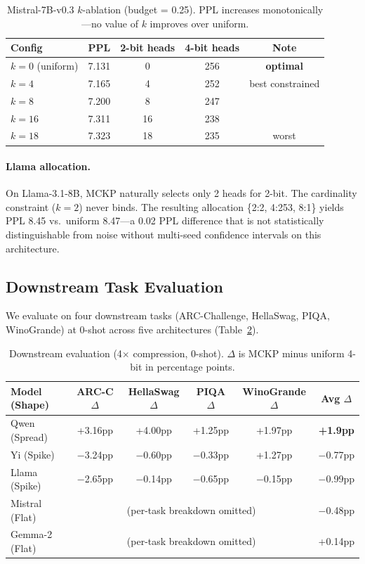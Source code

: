 \documentclass[11pt,a4paper]{article}
\begin{document}
\begin{table}[h]
\centering
\caption{Mistral-7B-v0.3 $k$-ablation (budget = 0.25). PPL increases monotonically---no value of $k$ improves over uniform.}
\label{tab:mistral_k}
\small
\begin{tabular}{lcccc}
\toprule
Config & PPL & 2-bit heads & 4-bit heads & Note \\
\midrule
$k=0$ (uniform) & 7.131 & 0 & 256 & \textbf{optimal} \\
$k=4$ & 7.165 & 4 & 252 & best constrained \\
$k=8$ & 7.200 & 8 & 247 & \\
$k=16$ & 7.311 & 16 & 238 & \\
$k=18$ & 7.323 & 18 & 235 & worst \\
\bottomrule
\end{tabular}
\end{table}

\paragraph{Llama allocation.}
On Llama-3.1-8B, MCKP naturally selects only 2 heads for 2-bit. The cardinality constraint ($k\!=\!2$) never binds.
The resulting allocation \{2:2, 4:253, 8:1\} yields PPL 8.45 vs.\ uniform 8.47---a 0.02 PPL difference that is not statistically distinguishable from noise without multi-seed confidence intervals on this architecture.

\subsection{Downstream Task Evaluation}\label{sec:downstream}

We evaluate on four downstream tasks (ARC-Challenge, HellaSwag, PIQA, WinoGrande) at 0-shot across five architectures (Table~\ref{tab:downstream}).

\begin{table}[h]
\centering
\caption{Downstream evaluation (4$\times$ compression, 0-shot). $\Delta$ is MCKP minus uniform 4-bit in percentage points.}
\label{tab:downstream}
\small
\begin{tabular}{lccccc}
\toprule
Model (Shape) & ARC-C $\Delta$ & HellaSwag $\Delta$ & PIQA $\Delta$ & WinoGrande $\Delta$ & Avg $\Delta$ \\
\midrule
Qwen (Spread) & +3.16pp & +4.00pp & +1.25pp & +1.97pp & \textbf{+1.9pp} \\
Yi (Spike) & $-$3.24pp & $-$0.60pp & $-$0.33pp & +1.27pp & $-$0.77pp \\
Llama (Spike) & $-$2.65pp & $-$0.14pp & $-$0.65pp & $-$0.15pp & $-$0.99pp \\
Mistral (Flat) & \multicolumn{4}{c}{(per-task breakdown omitted)} & $-$0.48pp \\
Gemma-2 (Flat) & \multicolumn{4}{c}{(per-task breakdown omitted)} & +0.14pp \\
\bottomrule
\end{tabular}
\end{table}
\end{document}
